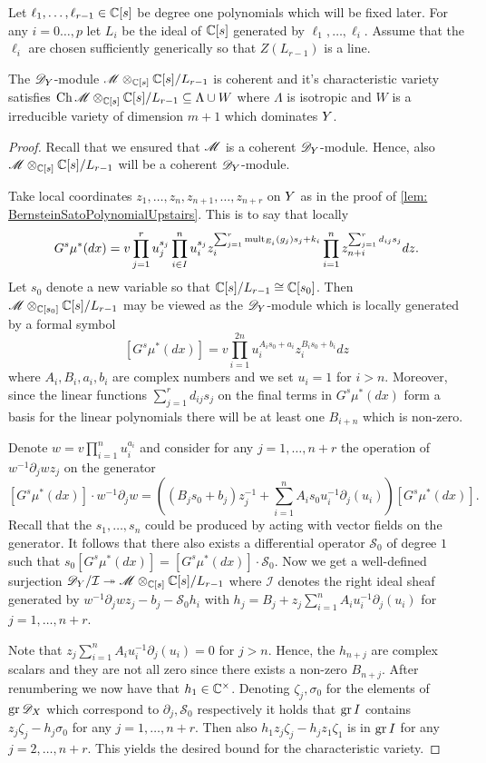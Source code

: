 Let $\ell_1,\ldots,\ell_{r-1}\in \mathbb{C}[s]$ be degree one polynomials which will be fixed later.
For any $i=0\ldots,p$ let $L_i$ be the ideal of $\mathbb{C}[s]$ generated by $\ell_1,\ldots,\ell_i$.
Assume that the $\ell_i$ are chosen sufficiently generically so that $Z(L_{r-1})$ is a line.
\begin{lemma}\label{lem: CharVarEstimateW}
  The $\mathscr{D}_Y$-module $\mathscr{M}\otimes_{\mathbb{C}[s]}\mathbb{C}[s]/L_{r-1}$ is coherent and it's characteristic variety satisfies $\operatorname{Ch}\mathscr{M}\otimes_{\mathbb{C}[s]}\mathbb{C}[s]/L_{r-1} \subseteq \Lambda \cup W $ where $\Lambda$ is isotropic and $W$ is a irreducible variety of dimension $m +1$ which dominates $Y$.
\end{lemma}
\begin{proof}
  Recall that we ensured that $\mathscr{M}$ is a coherent $\mathscr{D}_Y$-module.
  Hence, also $\mathscr{M}\otimes_{\mathbb{C}[s]}\mathbb{C}[s]/L_{r-1}$ will be a coherent $\mathscr{D}_Y$-module.

  Take local coordinates $z_1,\ldots,z_n,z_{n+1},\ldots,z_{n+r}$ on $Y$ as in the proof of \cref{lem: BernsteinSatoPolynomialUpstairs}.
  This is to say that locally
  $$G^s \mu^*(dx) = v\prod_{j=1}^r u_j^{s_j} \prod_{i\in I}^nu_i^{s_j}z_i^{\sum_{j=1}^r \operatorname{mult}_{E_i}(g_j) s_j + k_i}\prod_{i=1}^n z_{n+i}^{\sum_{j=1}^r d_{ij}s_j} dz.$$
  Let $s_0$ denote a new variable so that $\mathbb{C}[s]/L_{r-1}\cong \mathbb{C}[s_0]$.
  Then $\mathscr{M}\otimes_{\mathbb{C}[s_0]}\mathbb{C}[s]/L_{r-1}$ may be viewed as the $\mathscr{D}_Y$-module which is locally generated by a formal symbol
  $$[G^s \mu^*(dx)] =v \prod_{i=1}^{2n} u_i^{A_i s_0 + a_i}z_i^{B_i s_0 + b_i} dz $$
  where $A_i,B_i,a_i,b_i$ are complex numbers and we set $u_{i}=1$ for $i>n$.
  Moreover, since the linear functions $\sum_{j=1}^r d_{ij}s_j$ on the final terms in $G^s\mu^*(dx)$ form a basis for the linear polynomials there will be at least one $B_{i+n}$ which is non-zero.

  Denote $w = v\prod_{i=1}^n u_i^{a_i}$ and consider for any $j=1,\ldots,n+r$ the operation of $w^{-1}\partial_j wz_j$ on the generator
  $$[G^s \mu^*(dx)]\cdot w^{-1}\partial_j w =((B_j s_0 + b_j)z_j^{-1} + \sum_{i=1}^{n} A_i s_0 u_i^{-1}\partial_j(u_i) )[G^s \mu^*(dx)].$$
  Recall that the $s_1,\ldots,s_n$ could be produced by acting with vector fields on the generator.
  It follows that there also exists a differential operator $\mathcal{S}_0$ of degree $1$ such that $s_0 [G^s \mu^*(dx)] = [G^s \mu^*(dx)]\cdot \mathcal{S}_0$.
  Now we get a well-defined surjection $\mathscr{D}_Y/\mathcal{I} \twoheadrightarrow \mathscr{M}\otimes_{\mathbb{C}[s]}\mathbb{C}[s]/L_{r-1}$ where $\mathcal{I}$ denotes the right ideal sheaf generated by $w^{-1}\partial_j wz_j - b_j - \mathcal{S}_0 h_i$ with $h_j = B_j + z_j\sum_{i=1}^n A_iu_i^{-1}\partial_j(u_i)$ for $j=1,\ldots, n+r$.

  Note that $ z_j\sum_{i=1}^n A_iu_i^{-1}\partial_j(u_i) = 0$ for $j>n$.
  Hence, the $h_{n+j}$ are complex scalars and they are not all zero since there exists a non-zero $B_{n+j}$.
  After renumbering we now have that $h_1 \in \mathbb{C}^\times$.
  Denoting $\zeta_j, \sigma_0$ for the elements of $\operatorname{gr} \mathscr{D}_X$ which correspond to $\partial_j, \mathcal{S}_0$ respectively it holds that $\operatorname{gr} I$ contains $z_j \zeta_j - h_j \sigma_0$ for any $j=1,\ldots, n+r$.
  Then also $h_1z_j \zeta_j - h_jz_1 \zeta_1$ is in $\operatorname{gr} I$ for any $j=2,\ldots, n+r$.
  This yields the desired bound for the characteristic variety.
\end{proof}
